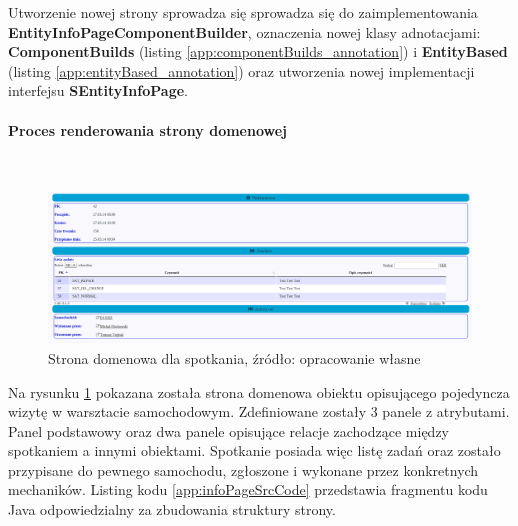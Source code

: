 	Utworzenie nowej strony sprowadza się sprowadza się do zaimplementowania \textbf{EntityInfoPageComponentBuilder}, oznaczenia nowej klasy adnotacjami: \textbf{ComponentBuilds} (listing \ref{app:componentBuilds_annotation}) i \textbf{EntityBased} (listing \ref{app:entityBased_annotation}) oraz utworzenia nowej implementacji interfejsu \textbf{SEntityInfoPage}. 
	\clearpage
	\paragraph{Proces renderowania strony domenowej} \hspace{0pt} \\
	\begin{figure}[H]
		\centering
		\includegraphics[width=1.0\textwidth]{images/infoPage}
		\caption[Strona domenowa dla spotkania]{
			Strona domenowa dla spotkania, źródło: opracowanie własne	
		}
		\label{app:infoPage}
	\end{figure}
	
	Na rysunku \ref{app:infoPage} pokazana została strona domenowa obiektu opisującego pojedyncza wizytę w warsztacie samochodowym. Zdefiniowane zostały 3 panele z atrybutami. Panel podstawowy oraz dwa panele opisujące relacje zachodzące między spotkaniem a innymi obiektami. Spotkanie posiada więc listę zadań oraz zostało przypisane do pewnego samochodu, zgłoszone i wykonane przez konkretnych mechaników. Listing kodu \ref{app:infoPageSrcCode} przedstawia fragmentu kodu Java odpowiedzialny za zbudowania struktury strony.
	
